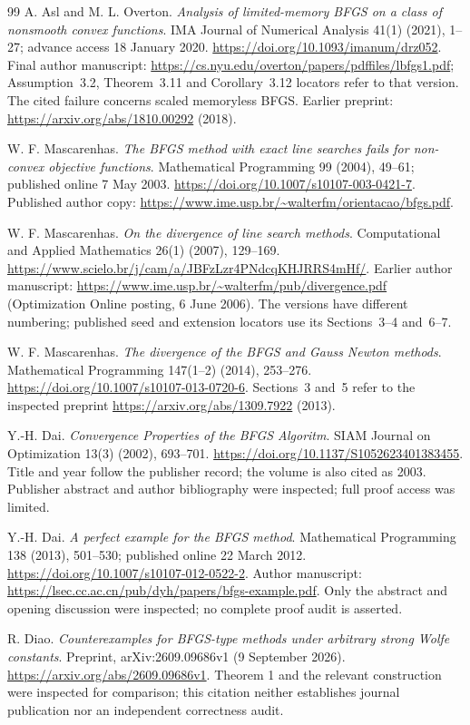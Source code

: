 \begin{thebibliography}{99}
A. Asl and M. L. Overton. \emph{Analysis of limited-memory BFGS on a class of nonsmooth convex functions}. IMA Journal of Numerical Analysis 41(1) (2021), 1--27; advance access 18 January 2020. \url{https://doi.org/10.1093/imanum/drz052}. Final author manuscript: \url{https://cs.nyu.edu/overton/papers/pdffiles/lbfgs1.pdf}; Assumption~3.2, Theorem~3.11 and Corollary~3.12 locators refer to that version. The cited failure concerns scaled memoryless BFGS. Earlier preprint: \url{https://arxiv.org/abs/1810.00292} (2018).

W. F. Mascarenhas. \emph{The BFGS method with exact line searches fails for non-convex objective functions}. Mathematical Programming 99 (2004), 49--61; published online 7 May 2003. \url{https://doi.org/10.1007/s10107-003-0421-7}. Published author copy: \url{https://www.ime.usp.br/~walterfm/orientacao/bfgs.pdf}.

W. F. Mascarenhas. \emph{On the divergence of line search methods}. Computational and Applied Mathematics 26(1) (2007), 129--169. \url{https://www.scielo.br/j/cam/a/JBFzLzr4PNdcqKHJRRS4mHf/}. Earlier author manuscript: \url{https://www.ime.usp.br/~walterfm/pub/divergence.pdf} (Optimization Online posting, 6 June 2006). The versions have different numbering; published seed and extension locators use its Sections~3--4 and~6--7.

W. F. Mascarenhas. \emph{The divergence of the BFGS and Gauss Newton methods}. Mathematical Programming 147(1--2) (2014), 253--276. \url{https://doi.org/10.1007/s10107-013-0720-6}. Sections~3 and~5 refer to the inspected preprint \url{https://arxiv.org/abs/1309.7922} (2013).

Y.-H. Dai. \emph{Convergence Properties of the BFGS Algoritm}. SIAM Journal on Optimization 13(3) (2002), 693--701. \url{https://doi.org/10.1137/S1052623401383455}. Title and year follow the publisher record; the volume is also cited as 2003. Publisher abstract and author bibliography were inspected; full proof access was limited.

Y.-H. Dai. \emph{A perfect example for the BFGS method}. Mathematical Programming 138 (2013), 501--530; published online 22 March 2012. \url{https://doi.org/10.1007/s10107-012-0522-2}. Author manuscript: \url{https://lsec.cc.ac.cn/pub/dyh/papers/bfgs-example.pdf}. Only the abstract and opening discussion were inspected; no complete proof audit is asserted.

R. Diao. \emph{Counterexamples for BFGS-type methods under arbitrary strong Wolfe constants}. Preprint, arXiv:2609.09686v1 (9 September 2026). \url{https://arxiv.org/abs/2609.09686v1}. Theorem 1 and the relevant construction were inspected for comparison; this citation neither establishes journal publication nor an independent correctness audit.


\end{thebibliography}
